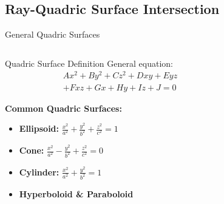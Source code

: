 \subsection{Ray-Quadric Surface Intersection}
\begin{frame}{General Quadric Surfaces}
    \begin{columns}
        \begin{column}{0.6\textwidth}
            \begin{mathbox}{Quadric Surface Definition}
                General equation:
                \begin{align*}
                    Ax^2 + By^2 + Cz^2 + Dxy + Eyz \\ + Fxz
                    + Gx + Hy + Iz + J = 0
                \end{align*}
                
                \textbf{Common Quadric Surfaces:}
                \begin{itemize}
                    \item \textbf{Ellipsoid:} $\frac{x^2}{a^2} + \frac{y^2}{b^2} + \frac{z^2}{c^2} = 1$
                    \item \textbf{Cone:} $\frac{x^2}{a^2} - \frac{y^2}{b^2} + \frac{z^2}{c^2} = 0$
                    \item \textbf{Cylinder:} $\frac{x^2}{a^2} + \frac{y^2}{b^2} = 1$
                    \item \textbf{Hyperboloid \& Paraboloid}
                \end{itemize}
            \end{mathbox}
        \end{column}
        \begin{column}{0.4\textwidth}
\end{column}
\end{columns}
\end{frame}
